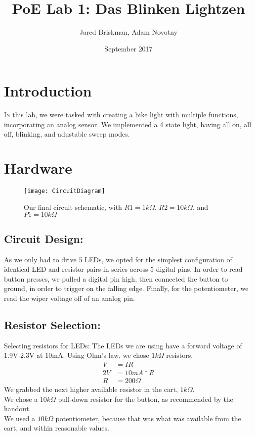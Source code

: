 \documentclass{article}
\title{PoE Lab 1: Das Blinken Lightzen}
\author{Jared Briskman, Adam Novotny}
\date{September 2017}
\begin{document}
\maketitle{}

\thispagestyle{empty}

\section{Introduction}

\lettrine{I}{n} this lab, we were tasked with creating a bike light with multiple functions, incorporating an analog sensor. We implemented a 4 state light, having all on, all off, blinking, and adustable sweep modes.

\section{Hardware}

\begin{figure}[h]
    \centering
    \texttt{[image: CircuitDiagram]}
    \caption{Our final circuit schematic, with $R1 = 1 k \Omega$, $R2 = 10 k \Omega$, and $P1 = 10k \Omega$}
    \label{fig:circuit}
\end{figure}

\subsection{Circuit Design:}
As we only had to drive 5 LEDs, we opted for the simplest configuration of identical LED and resistor pairs in series across 5 digital pins. In order to read button presses, we pulled a digital pin high, then connected the button to ground, in order to trigger on the falling edge. Finally, for the potentiometer, we read the wiper voltage off of an analog pin. 

\subsection{Resistor Selection:}
Selecting resistors for LEDs:
The LEDs we are using have a forward voltage of 1.9V-2.3V at 10mA\cite{ledDatasheet}. Using Ohm's law, we chose $1k\Omega$ resistors.
\begin{align*}
    V&=IR\\
    2V&=10mA * R\\
    R&=200\Omega
\end{align*}
We grabbed the next higher available resistor in the cart, $1k\Omega$.\\
We chose a $10k\Omega$ pull-down resistor for the button, as recommended by the handout\cite{labHandout}.\\
We used a $10k\Omega$ potentiometer, because that was what was available from the cart, and within reasonable values.\\
\end{document}
